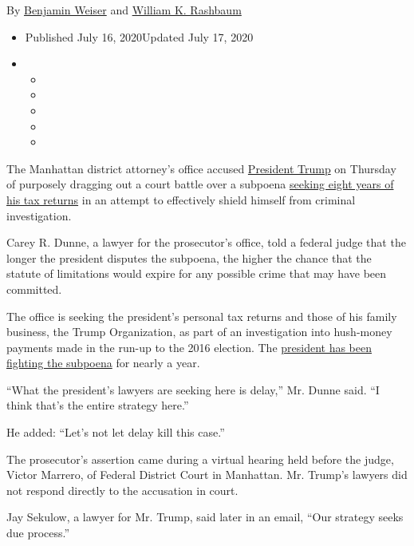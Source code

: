 By \href{https://www.nytimes3xbfgragh.onion/by/benjamin-weiser}{Benjamin
Weiser} and
\href{https://www.nytimes3xbfgragh.onion/by/william-k-rashbaum}{William
K. Rashbaum}

\begin{itemize}
\item
  Published July 16, 2020Updated July 17, 2020
\item
  \begin{itemize}
  \item
  \item
  \item
  \item
  \item
  \end{itemize}
\end{itemize}

The Manhattan district attorney's office accused
\href{https://www.nytimes3xbfgragh.onion/2019/07/29/nyregion/trump-sharpton-ny-history.html}{President
Trump} on Thursday of purposely dragging out a court battle over a
subpoena
\href{https://www.nytimes3xbfgragh.onion/2020/08/03/nyregion/donald-trump-taxes-cyrus-vance.html}{seeking
eight years of his tax returns} in an attempt to effectively shield
himself from criminal investigation.

Carey R. Dunne, a lawyer for the prosecutor's office, told a federal
judge that the longer the president disputes the subpoena, the higher
the chance that the statute of limitations would expire for any possible
crime that may have been committed.

The office is seeking the president's personal tax returns and those of
his family business, the Trump Organization, as part of an investigation
into hush-money payments made in the run-up to the 2016 election. The
\href{https://www.nytimes3xbfgragh.onion/2020/07/09/us/politics/trump-taxes.html}{president
has been fighting the subpoena} for nearly a year.

``What the president's lawyers are seeking here is delay,'' Mr. Dunne
said. ``I think that's the entire strategy here.''

He added: ``Let's not let delay kill this case.''

The prosecutor's assertion came during a virtual hearing held before the
judge, Victor Marrero, of Federal District Court in Manhattan. Mr.
Trump's lawyers did not respond directly to the accusation in court.

Jay Sekulow, a lawyer for Mr. Trump, said later in an email, ``Our
strategy seeks due process.''

